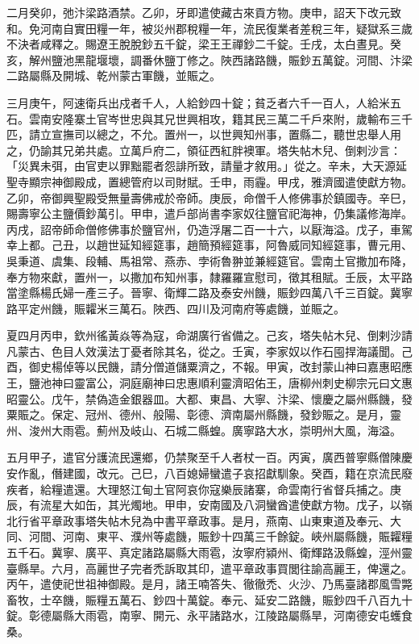 \begin{pinyinscope}
 二月癸卯，弛汴梁路酒禁。乙卯，牙即遣使藏古來貢方物。庚申，詔天下改元致和。免河南自實田糧一年，被災州郡稅糧一年，流民復業者差稅三年，疑獄系三歲不決者咸釋之。賜遼王脫脫鈔五千錠，梁王王禪鈔二千錠。壬戌，太白晝見。癸亥，解州鹽池黑龍堰壞，調番休鹽丁修之。陜西諸路饑，賑鈔五萬錠。河間、汴梁二路屬縣及開城、乾州蒙古軍饑，並賑之。



 三月庚午，阿速衛兵出戍者千人，人給鈔四十錠；貧乏者六千一百人，人給米五石。雲南安隆寨土官岑世忠與其兄世興相攻，籍其民三萬二千戶來附，歲輸布三千匹，請立宣撫司以總之，不允。置州一，以世興知州事，置縣二，聽世忠舉人用之，仍諭其兄弟共處。立萬戶府二，領征西紅胖襖軍。塔失帖木兒、倒剌沙言：「災異未弭，由官吏以罪黜罷者怨誹所致，請量才敘用。」從之。辛未，大天源延聖寺顯宗神御殿成，置總管府以司財賦。壬申，雨霾。甲戌，雅濟國遣使獻方物。乙卯，帝御興聖殿受無量壽佛戒於帝師。庚辰，命僧千人修佛事於鎮國寺。辛巳，賜壽寧公主鹽價鈔萬引。甲申，遣戶部尚書李家奴往鹽官祀海神，仍集議修海岸。丙戌，詔帝師命僧修佛事於鹽官州，仍造浮屠二百一十六，以厭海溢。戊子，車駕幸上都。己丑，以趙世延知經筵事，趙簡預經筵事，阿魯威同知經筵事，曹元用、吳秉道、虞集、段輔、馬祖常、燕赤、孛術魯翀並兼經筵官。雲南土官撒加布降，奉方物來獻，置州一，以撒加布知州事，隸羅羅宣慰司，徵其租賦。壬辰，太平路當塗縣楊氏婦一產三子。晉寧、衛輝二路及泰安州饑，賑鈔四萬八千三百錠。冀寧路平定州饑，賑糶米三萬石。陜西、四川及河南府等處饑，並賑之。



 夏四月丙申，欽州徭黃焱等為寇，命湖廣行省備之。己亥，塔失帖木兒、倒剌沙請凡蒙古、色目人效漢法丁憂者除其名，從之。壬寅，李家奴以作石囤捍海議聞。己酉，御史楊倬等以民饑，請分僧道儲粟濟之，不報。甲寅，改封蒙山神曰嘉惠昭應王，鹽池神曰靈富公，洞庭廟神曰忠惠順利靈濟昭佑王，唐柳州刺史柳宗元曰文惠昭靈公。戊午，禁偽造金銀器皿。大都、東昌、大寧、汴梁、懷慶之屬州縣饑，發粟賑之。保定、冠州、德州、般陽、彰德、濟南屬州縣饑，發鈔賑之。是月，靈州、浚州大雨雹。薊州及岐山、石城二縣蝗。廣寧路大水，崇明州大風，海溢。



 五月甲子，遣官分護流民還鄉，仍禁聚至千人者杖一百。丙寅，廣西普寧縣僧陳慶安作亂，僭建國，改元。己巳，八百媳婦蠻遣子哀招獻馴象。癸酉，籍在京流民廢疾者，給糧遣還。大理怒江甸土官阿哀你寇樂辰諸寨，命雲南行省督兵捕之。庚辰，有流星大如缶，其光燭地。甲申，安南國及八洞蠻酋遣使獻方物。戊子，以嶺北行省平章政事塔失帖木兒為中書平章政事。是月，燕南、山東東道及奉元、大同、河間、河南、東平、濮州等處饑，賑鈔十四萬三千餘錠。峽州屬縣饑，賑糶糧五千石。冀寧、廣平、真定諸路屬縣大雨雹，汝寧府潁州、衛輝路汲縣蝗，涇州靈臺縣旱。六月，高麗世子完者禿訴取其印，遣平章政事買閭往諭高麗王，俾還之。丙午，遣使祀世祖神御殿。是月，諸王喃答失、徹徹禿、火沙、乃馬臺諸郡風雪斃畜牧，士卒饑，賑糧五萬石、鈔四十萬錠。奉元、延安二路饑，賑鈔四千八百九十錠。彰德屬縣大雨雹，南寧、開元、永平諸路水，江陵路屬縣旱，河南德安屯蠖食桑。




\end{pinyinscope}
